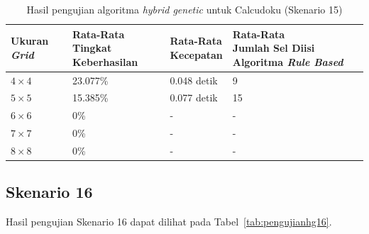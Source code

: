 \begin{table}
\centering
\captionsetup{justification=centering}
\caption[Hasil pengujian algoritma \textit{hybrid genetic} untuk Calcudoku (Skenario 15)]{Hasil pengujian algoritma \textit{hybrid genetic} untuk Calcudoku (Skenario 15)}
\begin{tabular}{| l | l | l | l |}
\hline
Ukuran \textit{Grid} & \makecell[c]{Rata-Rata \\ Tingkat Keberhasilan} & \makecell[c]{Rata-Rata \\ Kecepatan} & \makecell[c]{Rata-Rata \\ Jumlah Sel Diisi Algoritma \textit{Rule Based}} \\
\hline \hline
\begin{math}4 \times 4\end{math} & 23.077\% & 0.048 detik & 9 \\
\hline
\begin{math}5 \times 5\end{math} & 15.385\% & 0.077 detik & 15 \\
\hline
\begin{math}6 \times 6\end{math} & 0\% & - & - \\
\hline
\begin{math}7 \times 7\end{math} & 0\% & - & - \\
\hline
\begin{math}8 \times 8\end{math} & 0\% & - & - \\
\hline
\end{tabular}
\label{tab:pengujianhg15}
\end{table}

\subsection{Skenario 16}
\label{sec:skenario16}

Hasil pengujian Skenario 16 dapat dilihat pada Tabel~\ref{tab:pengujianhg16}.

